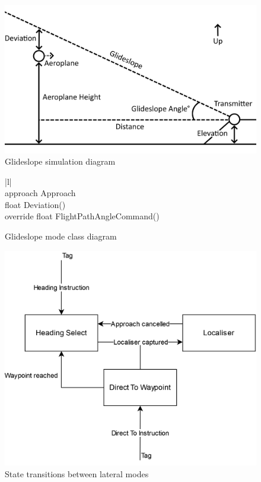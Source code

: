\documentclass{article}
\begin{document}
\begin{figure}[H]
\centering
\includegraphics{diagrams/glideslope.png}
\caption{\label{fig:glideslope}Glideslope simulation diagram}
\end{figure}

\begin{figure}[H]
\centering
\begin{tabular}{ |l| } 
\hline
{} \\
\hline
approach Approach \\
\hline
float Deviation() \\
override float FlightPathAngleCommand() \\
\hline
\end{tabular}
\caption{\label{fig:glideslopemodeclass}Glideslope mode class diagram}
\end{figure}

\begin{figure}[H]
\centering
\includegraphics{diagrams/lnav.png}
\caption{\label{fig:lnav}State transitions between lateral modes}
\end{figure}
\end{document}

